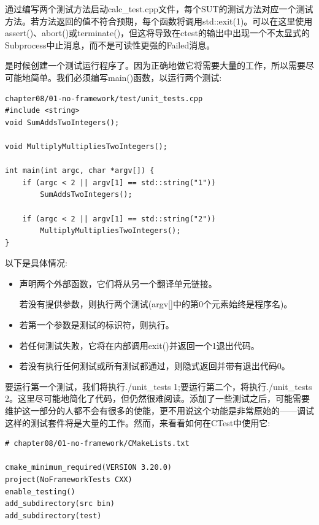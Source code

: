 通过编写两个测试方法启动calc\_test.cpp文件，每个SUT的测试方法对应一个测试方法。若方法返回的值不符合预期，每个函数将调用std::exit(1)。可以在这里使用assert()、abort()或terminate()，但这将导致在ctest的输出中出现一个不太显式的Subprocess中止消息，而不是可读性更强的Failed消息。

是时候创建一个测试运行程序了。因为正确地做它将需要大量的工作，所以需要尽可能地简单。我们必须编写main()函数，以运行两个测试:

\begin{lstlisting}[style=styleCXX]
chapter08/01-no-framework/test/unit_tests.cpp
#include <string>
void SumAddsTwoIntegers();

void MultiplyMultipliesTwoIntegers();

int main(int argc, char *argv[]) {
	if (argc < 2 || argv[1] == std::string("1"))
		SumAddsTwoIntegers();
	
	if (argc < 2 || argv[1] == std::string("2"))
		MultiplyMultipliesTwoIntegers();
}
\end{lstlisting} 

以下是具体情况:

\begin{itemize}
\item 
声明两个外部函数，它们将从另一个翻译单元链接。

若没有提供参数，则执行两个测试(argv[]中的第0个元素始终是程序名)。

\item 
若第一个参数是测试的标识符，则执行。

\item 
若任何测试失败，它将在内部调用exit()并返回一个1退出代码。

\item 
若没有执行任何测试或所有测试都通过，则隐式返回并带有退出代码0。
\end{itemize}

要运行第一个测试，我们将执行./unit\_tests 1;要运行第二个，将执行./unit\_tests 2。这里尽可能地简化了代码，但仍然很难阅读。添加了一些测试之后，可能需要维护这一部分的人都不会有很多的使能，更不用说这个功能是非常原始的——调试这样的测试套件将是大量的工作。然而，来看看如何在CTest中使用它:

\begin{lstlisting}[style=styleCMake]
# chapter08/01-no-framework/CMakeLists.txt

cmake_minimum_required(VERSION 3.20.0)
project(NoFrameworkTests CXX)
enable_testing()
add_subdirectory(src bin)
add_subdirectory(test)
\end{lstlisting} 


